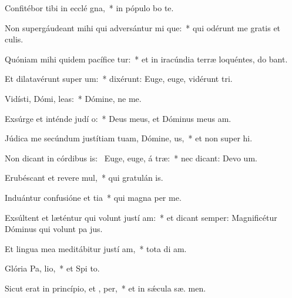 \item Confitébor tibi in ecclé gna,~* in pópulo  bo te.
\item Non supergáudeant mihi qui adversántur mi que:~* qui odérunt me gratis et  culis.
\item Quóniam mihi quidem pacífice tur:~* et in iracúndia terræ loquéntes, do bant.
\item Et dilatavérunt super   um:~* dixérunt: Euge, euge, vidérunt  tri.
\item Vidísti, Dómi,  leas:~* Dómine, ne   me.
\item Exsúrge et inténde judí o:~* Deus meus, et Dóminus meus   am.
\item Júdica me secúndum justítiam tuam, Dómine,  us,~* et non super hi.
\item Non dicant in córdibus is:~\pscross{} Euge, euge, á træ:~* nec dicant: Devo um.
\item Erubéscant et revere mul,~* qui gratulán  is.
\item Induántur confusióne et tia~* qui magna  per me.
\item Exsúltent et læténtur qui volunt justí am:~* et dicant semper: Magnificétur Dóminus qui volunt pa  jus.
\item Et lingua mea meditábitur justí am,~* tota di  am.
\item Glória Pa,  lio,~* et Spi to.
\item Sicut erat in princípio, et ,  per,~* et in sǽcula sæ. men.
